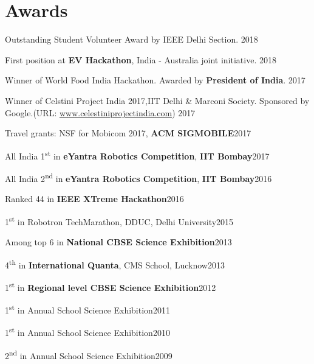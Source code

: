 \section{Awards}
\begin{innerlist}
\item Outstanding Student Volunteer Award by IEEE Delhi Section. \hfill 2018
\item First position at \textbf{EV Hackathon}, India - Australia joint initiative. \hfill 2018
\item Winner of World Food India Hackathon. Awarded by \textbf{President of India}. \hfill 2017
\item  Winner of Celstini Project India 2017,IIT Delhi & Marconi Society. Sponsored by Google.(URL: \href{http://www.celestiniprojectindia.com}{www.celestiniprojectindia.com}) \hfill 2017
\item Travel grants: NSF for Mobicom 2017, \textbf{ACM SIGMOBILE}\hfill 2017
\item All India 1\textsuperscript{st} in \textbf{eYantra Robotics Competition}, \textbf{IIT Bombay}\hfill 2017
\item All India 2\textsuperscript{nd} in \textbf{eYantra Robotics Competition}, \textbf{IIT Bombay}\hfill 2016
\item Ranked 44 in \textbf{IEEE XTreme Hackathon}\hfill  2016
\item 1\textsuperscript{st} in Robotron TechMarathon, DDUC, Delhi University\hfill 2015
\item Among top 6 in \textbf{National CBSE Science Exhibition}\hfill  2013
\item 4\textsuperscript{th} in \textbf{International Quanta}, CMS School, Lucknow\hfill 2013
\item 1\textsuperscript{st} in \textbf{Regional level CBSE Science Exhibition}\hfill  2012
\item 1\textsuperscript{st} in Annual School Science Exhibition\hfill 2011
\item 1\textsuperscript{st} in Annual School Science Exhibition\hfill  2010
\item 2\textsuperscript{nd} in Annual School Science Exhibition\hfill  2009
\end{innerlist}

\halfblankline


